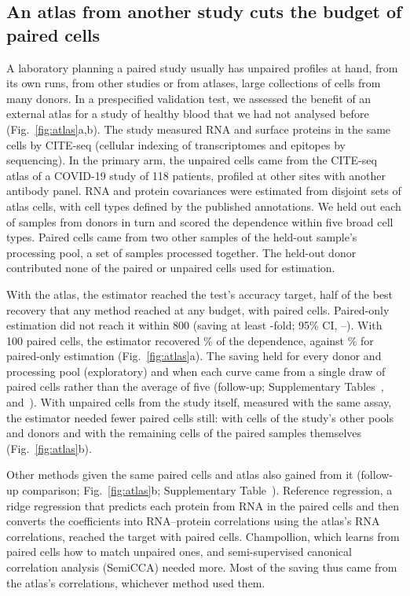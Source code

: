 \documentclass[pdflatex,sn-vancouver-num,iicol]{sn-jnl}
\begin{document}
\subsection{An atlas from another study cuts the budget of paired cells}
A laboratory planning a paired study usually has unpaired profiles at hand, from its own runs, from other studies or from atlases, large collections of cells from many donors. In a prespecified validation test, we assessed the benefit of an external atlas for a study of healthy blood that we had not analysed before (Fig.~\ref{fig:atlas}a,b). The study measured RNA and surface proteins in the same cells by CITE-seq (cellular indexing of transcriptomes and epitopes by sequencing)\cite{babdor2026}. In the primary arm, the unpaired cells came from the CITE-seq atlas of a COVID-19 study of 118 patients, profiled at other sites with another antibody panel\cite{stephenson2021}. RNA and protein covariances were estimated from disjoint sets of atlas cells, with cell types defined by the published annotations. We held out each of \VlNFolds{} samples from \VlNDonors{} donors in turn and scored the dependence within five broad cell types. Paired cells came from two other samples of the held-out sample's processing pool, a set of samples processed together. The held-out donor contributed none of the paired or unpaired cells used for estimation.

With the atlas, the estimator reached the test's accuracy target, half of the best recovery that any method reached at any budget, with \VlCellsAtlas{} paired cells. Paired-only estimation did not reach it within 800 (saving at least \VlSaveAtlas-fold; 95\% CI, \VlSaveAtlasLo--\VlSaveAtlasHi). With 100 paired cells, the estimator recovered \VlRfAtlasHundred\% of the dependence, against \VlRfPairedHundred\% for paired-only estimation (Fig.~\ref{fig:atlas}a). The saving held for every donor and processing pool (exploratory) and when each curve came from a single draw of paired cells rather than the average of five (follow-up; Supplementary Tables~,  and~). With unpaired cells from the study itself, measured with the same assay, the estimator needed fewer paired cells still: \VlCellsOther{} with cells of the study's other pools and donors and \VlCellsOwn{} with the remaining cells of the paired samples themselves (Fig.~\ref{fig:atlas}b).

Other methods given the same paired cells and atlas also gained from it (follow-up comparison; Fig.~\ref{fig:atlas}b; Supplementary Table~). Reference regression, a ridge regression that predicts each protein from RNA in the paired cells and then converts the coefficients into RNA--protein correlations using the atlas's RNA correlations, reached the target with \AltCellsRidge{} paired cells. Champollion\cite{champollion}, which learns from paired cells how to match unpaired ones, and semi-supervised canonical correlation analysis (SemiCCA)\cite{kimura2013} needed more. Most of the saving thus came from the atlas's correlations, whichever method used them.
\end{document}
